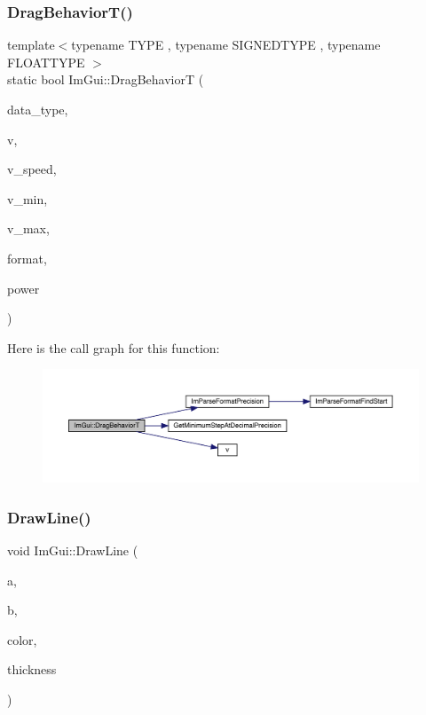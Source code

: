 \subsubsection{\texorpdfstring{Drag\+Behavior\+T()}{DragBehaviorT()}}
{\footnotesize\ttfamily template$<$typename T\+Y\+PE , typename S\+I\+G\+N\+E\+D\+T\+Y\+PE , typename F\+L\+O\+A\+T\+T\+Y\+PE $>$ \\
static bool Im\+Gui\+::\+Drag\+BehaviorT (\begin{DoxyParamCaption}\item[{Im\+Gui\+Data\+Type}]{data\+\_\+type,  }\item[{T\+Y\+PE $\ast$}]{v,  }\item[{float}]{v\+\_\+speed,  }\item[{const T\+Y\+PE}]{v\+\_\+min,  }\item[{const T\+Y\+PE}]{v\+\_\+max,  }\item[{const char $\ast$}]{format,  }\item[{float}]{power }\end{DoxyParamCaption})\hspace{0.3cm}{\ttfamily [static]}}

Here is the call graph for this function\+:
\nopagebreak
\begin{figure}[H]
\begin{center}
\leavevmode
\includegraphics[width=350pt]{df/d13/namespace_im_gui_adfdce5dc614de9fe81b3e50c53b8f5df_cgraph}
\end{center}
\end{figure}
\mbox{\label{namespace_im_gui_a9755035852a0a56e278947806b1ebed1}} 
\subsubsection{\texorpdfstring{Draw\+Line()}{DrawLine()}}
{\footnotesize\ttfamily void Im\+Gui\+::\+Draw\+Line (\begin{DoxyParamCaption}\item[{const sf\+::\+Vector2f \&}]{a,  }\item[{const sf\+::\+Vector2f \&}]{b,  }\item[{const sf\+::\+Color \&}]{color,  }\item[{float}]{thickness }\end{DoxyParamCaption})}

